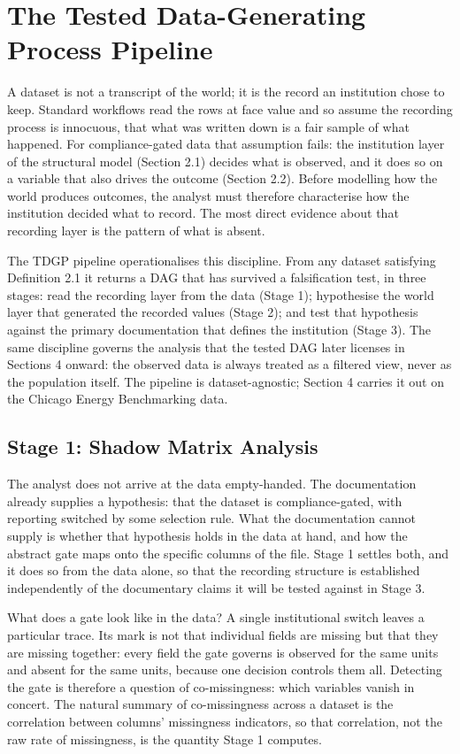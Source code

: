 \FloatBarrier
\section{The Tested Data-Generating Process Pipeline}

A dataset is not a transcript of the world; it is the record an institution chose to keep. Standard workflows read the rows at face value and so assume the recording process is innocuous, that what was written down is a fair sample of what happened. For compliance-gated data that assumption fails: the institution layer of the structural model (Section 2.1) decides what is observed, and it does so on a variable that also drives the outcome (Section 2.2). Before modelling how the world produces outcomes, the analyst must therefore characterise how the institution decided what to record. The most direct evidence about that recording layer is the pattern of what is absent.

The TDGP pipeline operationalises this discipline. From any dataset satisfying Definition 2.1 it returns a DAG that has survived a falsification test, in three stages: read the recording layer from the data (Stage 1); hypothesise the world layer that generated the recorded values (Stage 2); and test that hypothesis against the primary documentation that defines the institution (Stage 3). The same discipline governs the analysis that the tested DAG later licenses in Sections 4 onward: the observed data is always treated as a filtered view, never as the population itself. The pipeline is dataset-agnostic; Section 4 carries it out on the Chicago Energy Benchmarking data.


\subsection{Stage 1: Shadow Matrix Analysis}

The analyst does not arrive at the data empty-handed. The documentation already supplies a hypothesis: that the dataset is compliance-gated, with reporting switched by some selection rule. What the documentation cannot supply is whether that hypothesis holds in the data at hand, and how the abstract gate maps onto the specific columns of the file. Stage 1 settles both, and it does so from the data alone, so that the recording structure is established independently of the documentary claims it will be tested against in Stage 3.

What does a gate look like in the data? A single institutional switch leaves a particular trace. Its mark is not that individual fields are missing but that they are missing together: every field the gate governs is observed for the same units and absent for the same units, because one decision controls them all. Detecting the gate is therefore a question of co-missingness: which variables vanish in concert. The natural summary of co-missingness across a dataset is the correlation between columns' missingness indicators, so that correlation, not the raw rate of missingness, is the quantity Stage 1 computes.

